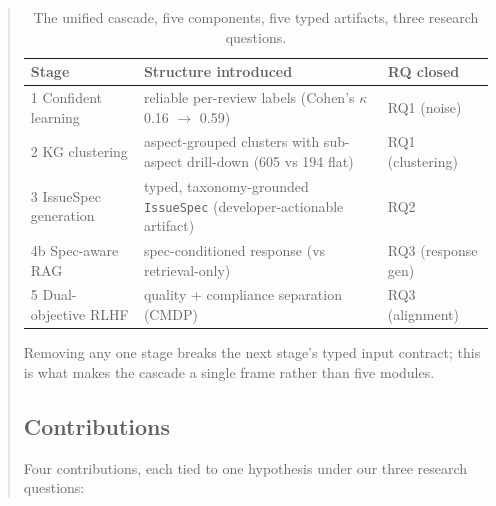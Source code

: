 \documentclass[sigconf, nonacm, anonymous, balance=false]{acmart}
\begin{document}
\begin{abstract}
\begin{table}[t]\centering\footnotesize\setlength{\tabcolsep}{2pt}
\caption{The unified cascade, five components, five typed artifacts, three research questions.}\label{tab:cascade}
\begin{tabular}{p{1.6cm}p{2.8cm}p{2.6cm}}\toprule
Stage & Structure introduced & RQ closed \\\midrule
1 Confident learning & reliable per-review labels (Cohen's $\kappa$ 0.16 $\rightarrow$ 0.59) & RQ1 (noise) \\
2 KG clustering & aspect-grouped clusters with sub-aspect drill-down (605 vs 194 flat) & RQ1 (clustering) \\
3 IssueSpec generation & typed, taxonomy-grounded \texttt{IssueSpec} (developer-actionable artifact) & RQ2 \\
4b Spec-aware RAG & spec-conditioned response (vs retrieval-only) & RQ3 (response gen) \\
5 Dual-objective RLHF & quality + compliance separation (CMDP) & RQ3 (alignment) \\\bottomrule
\end{tabular}\end{table}

Removing any one stage breaks the next stage's typed input contract; this is what makes the cascade a single frame rather than five modules.

\subsection{Contributions}\label{contributions}

Four contributions, each tied to one hypothesis under our three research questions:


\end{abstract}
\end{document}
